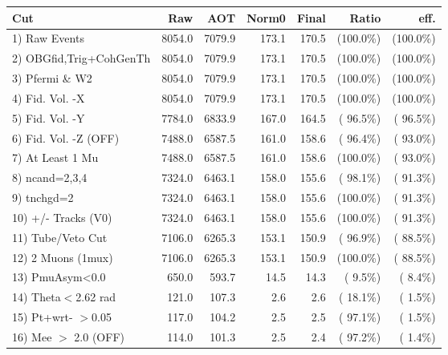  \begin{table}[h!]\centering
 \begin{tabular}{||l||r|r|r|r|r|r||}
 \hline
 \hline
 Cut & Raw & AOT & Norm0 & Final & Ratio & eff.       \\
 \hline
  1) Raw Events           &       8054.0 &       7079.9 &        173.1 &        170.5 & (100.0\%) & (100.0\%) \\
  2) OBGfid,Trig+CohGenTh &       8054.0 &       7079.9 &        173.1 &        170.5 & (100.0\%) & (100.0\%) \\
  3) Pfermi \& W2         &       8054.0 &       7079.9 &        173.1 &        170.5 & (100.0\%) & (100.0\%) \\
  4) Fid. Vol. -X         &       8054.0 &       7079.9 &        173.1 &        170.5 & (100.0\%) & (100.0\%) \\
  5) Fid. Vol. -Y         &       7784.0 &       6833.9 &        167.0 &        164.5 & ( 96.5\%) & ( 96.5\%) \\
  6) Fid. Vol. -Z (OFF)   &       7488.0 &       6587.5 &        161.0 &        158.6 & ( 96.4\%) & ( 93.0\%) \\
  7) At Least 1 Mu        &       7488.0 &       6587.5 &        161.0 &        158.6 & (100.0\%) & ( 93.0\%) \\
  8) ncand=2,3,4          &       7324.0 &       6463.1 &        158.0 &        155.6 & ( 98.1\%) & ( 91.3\%) \\
  9) tnchgd=2             &       7324.0 &       6463.1 &        158.0 &        155.6 & (100.0\%) & ( 91.3\%) \\
 10) +/- Tracks (V0)      &       7324.0 &       6463.1 &        158.0 &        155.6 & (100.0\%) & ( 91.3\%) \\
 11) Tube/Veto Cut        &       7106.0 &       6265.3 &        153.1 &        150.9 & ( 96.9\%) & ( 88.5\%) \\
 12) 2 Muons (1mux)       &       7106.0 &       6265.3 &        153.1 &        150.9 & (100.0\%) & ( 88.5\%) \\
 13) PmuAsym<0.0          &        650.0 &        593.7 &         14.5 &         14.3 & (  9.5\%) & (  8.4\%) \\
 14) Theta$<$2.62 rad     &        121.0 &        107.3 &          2.6 &          2.6 & ( 18.1\%) & (  1.5\%) \\
 15) Pt+wrt- $>$0.05      &        117.0 &        104.2 &          2.5 &          2.5 & ( 97.1\%) & (  1.5\%) \\
 16) Mee $>$ 2.0  (OFF)   &        114.0 &        101.3 &          2.5 &          2.4 & ( 97.2\%) & (  1.4\%) \\

\end{tabular}
\end{table}
